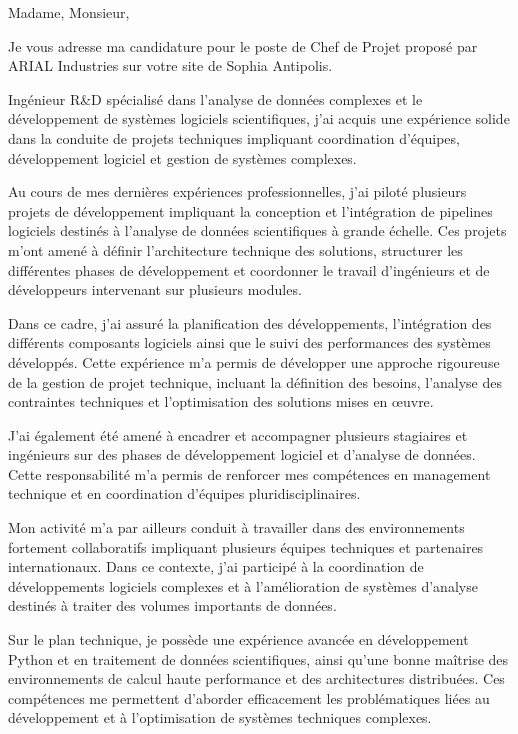 \documentclass[11pt,a4paper]{../_shared/altacv}
\begin{document}
{\color{body}

Madame, Monsieur,

Je vous adresse ma candidature pour le poste de Chef de Projet proposé par ARIAL Industries sur votre site de Sophia Antipolis.

Ingénieur R\&D spécialisé dans l’analyse de données complexes et le développement de systèmes logiciels scientifiques, j’ai acquis une expérience solide dans la conduite de projets techniques impliquant coordination d’équipes, développement logiciel et gestion de systèmes complexes.

Au cours de mes dernières expériences professionnelles, j’ai piloté plusieurs projets de développement impliquant la conception et l’intégration de pipelines logiciels destinés à l’analyse de données scientifiques à grande échelle. Ces projets m’ont amené à définir l’architecture technique des solutions, structurer les différentes phases de développement et coordonner le travail d’ingénieurs et de développeurs intervenant sur plusieurs modules.

Dans ce cadre, j’ai assuré la planification des développements, l’intégration des différents composants logiciels ainsi que le suivi des performances des systèmes développés. Cette expérience m’a permis de développer une approche rigoureuse de la gestion de projet technique, incluant la définition des besoins, l’analyse des contraintes techniques et l’optimisation des solutions mises en œuvre.

J’ai également été amené à encadrer et accompagner plusieurs stagiaires et ingénieurs sur des phases de développement logiciel et d’analyse de données. Cette responsabilité m’a permis de renforcer mes compétences en management technique et en coordination d’équipes pluridisciplinaires.

Mon activité m’a par ailleurs conduit à travailler dans des environnements fortement collaboratifs impliquant plusieurs équipes techniques et partenaires internationaux. Dans ce contexte, j’ai participé à la coordination de développements logiciels complexes et à l’amélioration de systèmes d’analyse destinés à traiter des volumes importants de données.

Sur le plan technique, je possède une expérience avancée en développement Python et en traitement de données scientifiques, ainsi qu’une bonne maîtrise des environnements de calcul haute performance et des architectures distribuées. Ces compétences me permettent d’aborder efficacement les problématiques liées au développement et à l’optimisation de systèmes techniques complexes.

}
\end{document}
